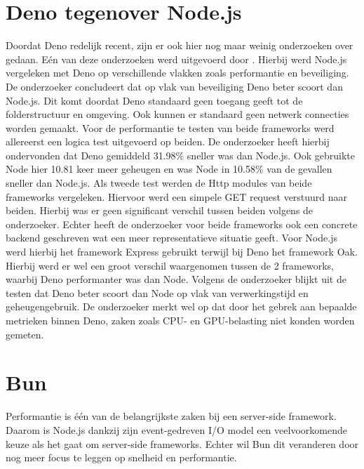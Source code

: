 \section{Deno tegenover Node.js}
Doordat Deno redelijk recent, zijn er ook hier nog maar weinig onderzoeken over gedaan. 
Eén van deze onderzoeken werd uitgevoerd door \textcite{VanKerkvoorde2021}.
Hierbij werd Node.js vergeleken met Deno op verschillende vlakken zoals performantie en beveiliging.
De onderzoeker concludeert dat op vlak van beveiliging Deno beter scoort dan Node.js. Dit komt doordat Deno
standaard geen toegang geeft tot de folderstructuur en omgeving. Ook kunnen er standaard geen netwerk connecties worden gemaakt.
Voor de performantie te testen van beide frameworks werd allereerst een logica test uitgevoerd op beiden. De onderzoeker heeft hierbij
ondervonden dat Deno gemiddeld 31.98\% sneller
was dan Node.js. Ook gebruikte Node hier 10.81 keer meer geheugen en was Node in 10.58\% van de gevallen sneller dan Node.js.
Als tweede test werden de Http modules van beide frameworks vergeleken.
Hiervoor werd een simpele GET request verstuurd naar beiden. Hierbij was er geen significant
verschil tussen beiden volgens de onderzoeker.
Echter heeft de onderzoeker voor beide frameworks ook een concrete backend geschreven wat een meer representatieve situatie geeft.
Voor Node.js werd hierbij het framework Express gebruikt terwijl bij Deno het framework Oak. Hierbij werd er wel een groot
verschil waargenomen tussen de 2 frameworks, waarbij Deno performanter was dan Node. Volgens de onderzoeker blijkt uit de testen dat Deno
beter scoort dan Node op vlak van verwerkingstijd en geheugengebruik. De onderzoeker merkt
wel op dat door het gebrek aan bepaalde metrieken
binnen Deno, zaken zoals CPU- en GPU-belasting niet konden worden gemeten.


\section{Bun}
Performantie is één van de belangrijkste zaken bij een server-side framework. 
Daarom is Node.js dankzij zijn event-gedreven I/O model een veelvoorkomende keuze als het gaat om server-side frameworks.
Echter wil Bun dit veranderen door nog meer focus te leggen op snelheid en performantie.


